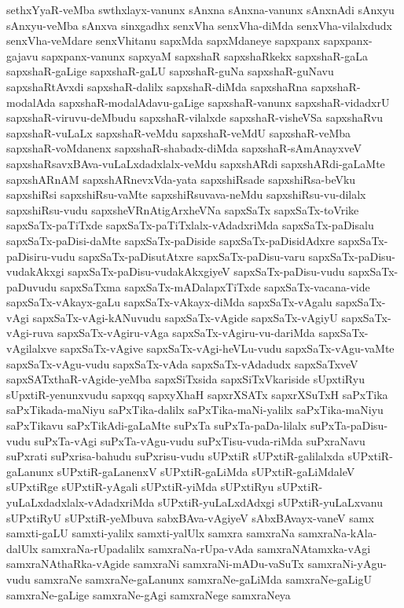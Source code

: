 {sethxYyaR-veMba
swthxlayx-vanunx
sAnxna
sAnxna-vanunx
sAnxnAdi
sAnxyu
sAnxyu-veMba
sAnxva
sinxgadhx
senxVha
senxVha-diMda
senxVha-vilalxdudx
senxVha-veMdare
senxVhitanu
sapxMda
sapxMdaneye
sapxpanx
sapxpanx-gajavu
sapxpanx-vanunx
sapxyaM
sapxshaR
sapxshaRkekx
sapxshaR-gaLa
sapxshaR-gaLige
sapxshaR-gaLU
sapxshaR-guNa
sapxshaR-guNavu
sapxshaRtAvxdi
sapxshaR-dalilx
sapxshaR-diMda
sapxshaRna
sapxshaR-modalAda
sapxshaR-modalAdavu-gaLige
sapxshaR-vanunx
sapxshaR-vidadxrU
sapxshaR-viruvu-deMbudu
sapxshaR-vilalxde
sapxshaR-visheVSa
sapxshaRvu
sapxshaR-vuLaLx
sapxshaR-veMdu
sapxshaR-veMdU
sapxshaR-veMba
sapxshaR-voMdanenx
sapxshaR-shabadx-diMda
sapxshaR-sAmAnayxveV
sapxshaRsavxBAva-vuLaLxdadxlalx-veMdu
sapxshARdi
sapxshARdi-gaLaMte
sapxshARnAM
sapxshARnevxVda-yata
sapxshiRsade
sapxshiRsa-beVku
sapxshiRsi
sapxshiRsu-vaMte
sapxshiRsuvava-neMdu
sapxshiRsu-vu-dilalx
sapxshiRsu-vudu
sapxsheVRnAtigArxheVNa
sapxSaTx
sapxSaTx-toVrike
sapxSaTx-paTiTxde
sapxSaTx-paTiTxlalx-vAdadxriMda
sapxSaTx-paDisalu
sapxSaTx-paDisi-daMte
sapxSaTx-paDiside
sapxSaTx-paDisidAdxre
sapxSaTx-paDisiru-vudu
sapxSaTx-paDisutAtxre
sapxSaTx-paDisu-varu
sapxSaTx-paDisu-vudakAkxgi
sapxSaTx-paDisu-vudakAkxgiyeV
sapxSaTx-paDisu-vudu
sapxSaTx-paDuvudu
sapxSaTxma
sapxSaTx-mADalapxTiTxde
sapxSaTx-vacana-vide
sapxSaTx-vAkayx-gaLu
sapxSaTx-vAkayx-diMda
sapxSaTx-vAgalu
sapxSaTx-vAgi
sapxSaTx-vAgi-kANuvudu
sapxSaTx-vAgide
sapxSaTx-vAgiyU
sapxSaTx-vAgi-ruva
sapxSaTx-vAgiru-vAga
sapxSaTx-vAgiru-vu-dariMda
sapxSaTx-vAgilalxve
sapxSaTx-vAgive
sapxSaTx-vAgi-heVLu-vudu
sapxSaTx-vAgu-vaMte
sapxSaTx-vAgu-vudu
sapxSaTx-vAda
sapxSaTx-vAdadudx
sapxSaTxveV
sapxSATxthaR-vAgide-yeMba
sapxSiTxsida
sapxSiTxVkariside
sUpxtiRyu
sUpxtiR-yenunxvudu
sapxqq
sapxyXhaH
sapxrXSATx
sapxrXSuTxH
saPxTika
saPxTikada-maNiyu
saPxTika-dalilx
saPxTika-maNi-yalilx
saPxTika-maNiyu
saPxTikavu
saPxTikAdi-gaLaMte
suPxTa
suPxTa-paDa-lilalx
suPxTa-paDisu-vudu
suPxTa-vAgi
suPxTa-vAgu-vudu
suPxTisu-vuda-riMda
suPxraNavu
suPxrati
suPxrisa-bahudu
suPxrisu-vudu
sUPxtiR
sUPxtiR-galilalxda
sUPxtiR-gaLanunx
sUPxtiR-gaLanenxV
sUPxtiR-gaLiMda
sUPxtiR-gaLiMdaleV
sUPxtiRge
sUPxtiR-yAgali
sUPxtiR-yiMda
sUPxtiRyu
sUPxtiR-yuLaLxdadxlalx-vAdadxriMda
sUPxtiR-yuLaLxdAdxgi
sUPxtiR-yuLaLxvanu
sUPxtiRyU
sUPxtiR-yeMbuva
sabxBAva-vAgiyeV
sAbxBAvayx-vaneV
samx
samxti-gaLU
samxti-yalilx
samxti-yalUlx
samxra
samxraNa
samxraNa-kAla-dalUlx
samxraNa-rUpadalilx
samxraNa-rUpa-vAda
samxraNAtamxka-vAgi
samxraNAthaRka-vAgide
samxraNi
samxraNi-mADu-vaSuTx
samxraNi-yAgu-vudu
samxraNe
samxraNe-gaLanunx
samxraNe-gaLiMda
samxraNe-gaLigU
samxraNe-gaLige
samxraNe-gAgi
samxraNege
samxraNeya
}
